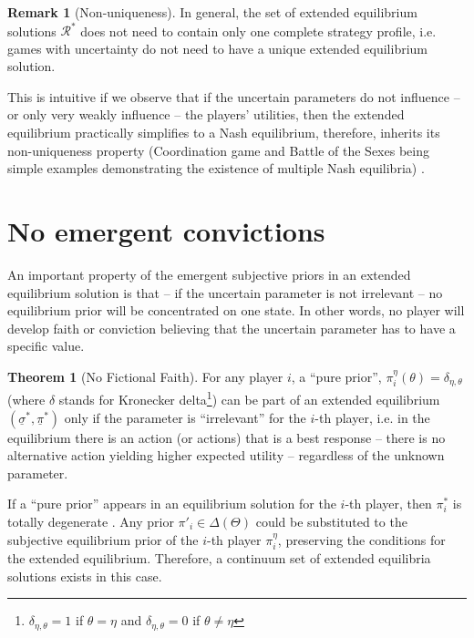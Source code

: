 \documentclass{article}
\theoremstyle{definition}
\newtheorem{theorem}{Theorem}[section]
\newtheorem*{remark}{Remark}
\begin{document}
\begin{remark}[Non-uniqueness]
    In general, the set of extended equilibrium solutions $\mathcal{R}^*$ does not need to contain only one complete strategy profile, i.e. games with uncertainty do not need to have a unique extended equilibrium solution.

    This is intuitive if we observe that if the uncertain parameters do not influence -- or only very weakly influence -- the players' utilities, then the extended equilibrium practically simplifies to a Nash equilibrium, therefore, inherits its non-uniqueness property (Coordination game and Battle of the Sexes being simple examples demonstrating the existence of multiple Nash equilibria) \cite{book:GameTheory}.
    
\end{remark}

\section{No emergent convictions}

An important property of the emergent subjective priors in an extended equilibrium solution is that -- if the uncertain parameter is not irrelevant -- no equilibrium prior will be concentrated on one state. In other words, no player will develop faith or conviction believing that the uncertain parameter has to have a specific value. 

\begin{theorem}[No Fictional Faith]
\label{thm:NoFictionalFaith}
    For any player $i$, a ``pure prior'', $\pi_i^{\eta}(\theta) = \delta_{\eta,\theta}$ (where $\delta$ stands for Kronecker delta\footnote{$\delta_{\eta,\theta} = 1$ if $\theta = \eta$ and $\delta_{\eta,\theta} = 0$ if $\theta \ne \eta$}) can be part of an extended equilibrium $(\underline{\sigma}^*, \underline{\pi}^*)$ only if the parameter is ``irrelevant'' for the $i$-th player, i.e. in the equilibrium there is an action (or actions) that is a best response -- there is no alternative action yielding higher expected utility -- regardless of the unknown parameter. 
    
    If a ``pure prior'' appears in an equilibrium solution for the $i$-th player, then  $\pi_i^*$ is totally degenerate \cite{book:AlgorithmicGameTheory,book:HandbookOfGameTheoryVol3}. Any prior $\pi'_i \in \Delta(\Theta)$ could be substituted to the subjective equilibrium prior of the $i$-th player $\pi_i^{\eta}$, preserving the conditions for the extended equilibrium. Therefore, a continuum set of extended equilibria solutions exists in this case.

\end{theorem}
\end{document}
